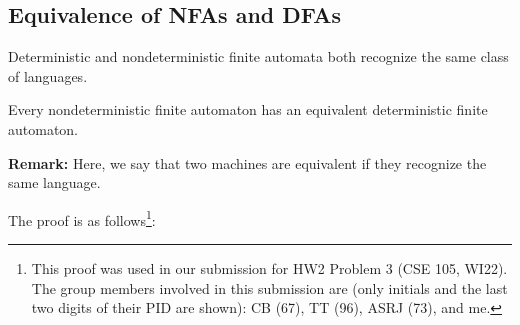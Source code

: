 \documentclass[letterpaper]{article}
\begin{document}
\subsection{Equivalence of NFAs and DFAs}
Deterministic and nondeterministic finite automata both recognize the same class of languages.

\begin{theorem}{}{}
    Every nondeterministic finite automaton has an equivalent deterministic finite automaton.
\end{theorem}
\textbf{Remark:} Here, we say that two machines are equivalent if they recognize the same language. 

\bigskip 

The proof is as follows\footnote{This proof was used in our submission for HW2 Problem 3 (CSE 105, WI22). The group members involved in this submission are (only initials and the last two digits of their PID are shown): CB (67), TT (96), ASRJ (73), and me.}:
\end{document}
